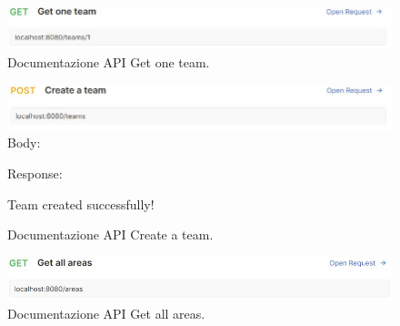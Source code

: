 \begin{figure}[h!]
	\centering
	\includegraphics[width=1\linewidth]{./Iterazione 2/ImageFiles/GetOneTeam}
	
	\caption{Documentazione API Get one team.}
	\label{fig:GetOneTeamAPI}
\end{figure}

\begin{figure}[h!]
	\centering
	\includegraphics[width=1\linewidth]{./Iterazione 2/ImageFiles/CreateATeam}
	Body:
	
	Response: 
	
	Team created successfully!
	\caption{Documentazione API Create a team.}
	\label{fig:CreateATeamAPI}
\end{figure}


\begin{figure}[h!]
	\centering
	\includegraphics[width=1\linewidth]{./Iterazione 2/ImageFiles/GetAllAreas}
	
	\caption{Documentazione API Get all areas.}
	\label{fig:GetAllAreasAPI}
\end{figure}
